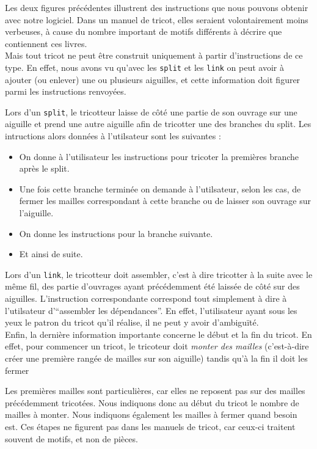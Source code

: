 \documentclass{article}
\begin{document}
Les deux figures précédentes illustrent des instructions que nous pouvons obtenir avec notre logiciel. 
Dans un manuel de tricot, elles seraient volontairement moins verbeuses, à cause du nombre important 
de motifs différents à décrire que contiennent ces livres. \\

Mais tout tricot ne peut être construit uniquement à partir d'instructions de ce type. En effet, nous 
avons vu qu'avec les \texttt{split} et les \texttt{link} on peut avoir à ajouter (ou enlever) 
une ou plusieurs aiguilles, et cette information doit figurer parmi les instructions renvoyées.

Lors d'un \texttt{split}, le tricotteur laisse de côté une partie de son ouvrage sur une aiguille et prend une autre aiguille afin de tricotter une des branches du split. Les intructions alors données à l'utilsateur sont les suivantes :
\begin{itemize}
 \item On donne à l'utilisateur les instructions pour tricoter la premières branche après le split.
 \item Une fois cette branche terminée on demande à l'utilsateur, selon les cas, de fermer les mailles correspondant à cette branche ou de laisser son ouvrage sur l'aiguille.
 \item On donne les instructions pour la branche suivante.
 \item Et ainsi de suite.
\end{itemize}

Lors d'un \texttt{link}, le tricotteur doit assembler, c'est à dire tricotter à la suite avec le même fil, des partie d'ouvrages ayant précédemment été laissée de côté sur des aiguilles. L'instruction correspondante correspond tout simplement à dire à l'utilsateur d'``assembler les dépendances''. En effet, l'utilisateur ayant sous les yeux le patron du tricot qu'il réalise, il ne peut y avoir d'ambiguïté. \\


Enfin, la dernière information importante concerne le début et la fin du tricot. En effet, pour commencer un tricot, 
le tricoteur doit \emph{monter des mailles} (c'est-à-dire créer une première rangée de mailles sur son 
aiguille) tandis qu'à la fin il doit les fermer 

Les premières mailles sont particulières, car elles ne 
reposent pas sur des mailles précédemment tricotées. Nous indiquons donc au début du tricot le nombre de 
mailles à monter.
Nous indiquons également les mailles à fermer quand besoin est.
Ces étapes ne figurent pas dans les manuels de tricot, car ceux-ci traitent souvent de 
motifs, et non de pièces. \\
\end{document}
